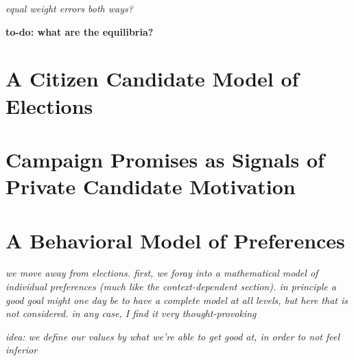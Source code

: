 \documentclass[../../../main.tex]{subfiles}
\begin{document}
\begin{remark}
    \textit{equal weight errors both ways?}
\end{remark}

\textbf{to-do: what are the equilibria?}

\section{A Citizen Candidate Model of Elections}

\nocite{besley1997economic}
\nocite{osborne1996model}

\section{Campaign Promises as Signals of Private Candidate Motivation}

\nocite{callander2008political}

\section{A Behavioral Model of Preferences}

\nocite{penn2017inequality}

\textit{we move away from elections. first, we foray into a mathematical model of individual preferences (much like the context-dependent section). in principle a good goal might one day be to have a complete model at all levels, but here that is not considered. in any case, I find it very thought-provoking}

\textit{idea: we define our values by what we're able to get good at, in order to not feel inferior}
\end{document}
